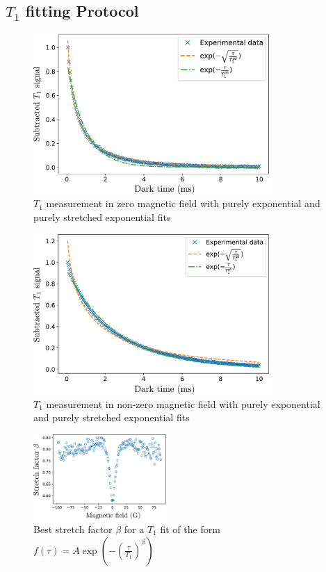\documentclass[preprintnumbers,amsmath,amssymb,onecolumn,12pt]{revtex4-2}
\begin{document}
\subsection{$T_1$ fitting Protocol}
\begin{figure}
\includegraphics[width=0.8\textwidth]{Figures_SI/Fig_T1_0B}
\caption{$T_1$ measurement in zero magnetic field with purely exponential and purely stretched exponential fits}
\label{T1_0B}
\end{figure}
\begin{figure}
\includegraphics[width=0.8\textwidth]{Figures_SI/Fig_T1_1x1x1x1}
\caption{$T_1$ measurement in non-zero magnetic field with purely exponential and purely stretched exponential fits}
\label{T1_1x4}
\end{figure}
\begin{figure}
\includegraphics[width=0.45\textwidth]{Figures_SI/fig_alphas}
\caption{Best stretch factor $\beta$ for a $T_1$ fit of the form $f(\tau)=A \exp(-(\frac{\tau}{T_1})^\beta)$}
\label{alphas}
\end{figure}
\end{document}
